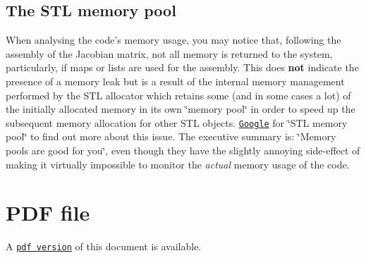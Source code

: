 \hypertarget{index_STL_pool}{}\subsection{The S\-T\-L memory pool}\label{index_STL_pool}
When analysing the code's memory usage, you may notice that, following the assembly of the Jacobian matrix, not all memory is returned to the system, particularly, if maps or lists are used for the assembly. This does {\bfseries not} indicate the presence of a memory leak but is a result of the internal memory management performed by the S\-T\-L allocator which retains some (and in some cases a lot) of the initially allocated memory in its own \char`\"{}memory pool\char`\"{} in order to speed up the subsequent memory allocation for other S\-T\-L objects. \href{http://www.google.com}{\tt Google} for \char`\"{}\-S\-T\-L memory pool\char`\"{} to find out more about this issue. The executive summary is\-: \char`\"{}\-Memory pools are good for you\char`\"{}, even though they have the slightly annoying side-\/effect of making it virtually impossible to monitor the {\itshape actual} memory usage of the code.



 

 \hypertarget{index_pdf}{}\section{P\-D\-F file}\label{index_pdf}
A \href{../latex/refman.pdf}{\tt pdf version} of this document is available. 